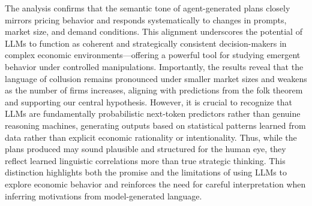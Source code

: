 The analysis confirms that the semantic tone of agent-generated plans closely mirrors pricing behavior and responds systematically to changes in prompts, market size, and demand conditions. This alignment underscores the potential of LLMs to function as coherent and strategically consistent decision-makers in complex economic environments—offering a powerful tool for studying emergent behavior under controlled manipulations. Importantly, the results reveal that the language of collusion remains pronounced under smaller market sizes and weakens as the number of firms increases, aligning with predictions from the folk theorem and supporting our central hypothesis. However, it is crucial to recognize that LLMs are fundamentally probabilistic next-token predictors rather than genuine reasoning machines, generating outputs based on statistical patterns learned from data rather than explicit economic rationality or intentionality. Thus, while the plans produced may sound plausible and structured for the human eye, they reflect learned linguistic correlations more than true strategic thinking. This distinction highlights both the promise and the limitations of using LLMs to explore economic behavior and reinforces the need for careful interpretation when inferring motivations from model-generated language.